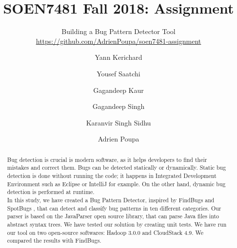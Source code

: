 \documentclass[sigconf]{acmart}
\begin{document}
\title{SOEN7481 Fall 2018: Assignment}
\subtitle{Building a Bug Pattern Detector Tool\\\url{https://github.com/AdrienPoupa/soen7481-assignment}}

\author{Yann Kerichard}

\author{Yousef Saatchi}

\author{Gagandeep Kaur}

\author{Gagandeep Singh}

\author{Karanvir Singh Sidhu}

\author{Adrien Poupa}


\begin{abstract}
Bug detection is crucial is modern software, as it helps developers to find their mistakes and correct them. Bugs can be detected statically or dynamically. Static bug detection is done without running the code; it happens in Integrated Development Environment such as Eclipse or IntelliJ for example. On the other hand, dynamic bug detection is performed at runtime.\\In this study, we have created a Bug Pattern Detector, inspired by FindBugs \cite{findbugs} and SpotBugs \cite{spotbugs}, that can detect and classify bug patterns in ten different categories. Our parser is based on the JavaParser \cite{javaparser} open source library, that can parse Java files into abstract syntax trees. We have tested our solution by creating unit tests. We have run our tool on two open-source softwares: Hadoop 3.0.0 and CloudStack 4.9. We compared the results with FindBugs. 

\end{abstract}


\maketitle
\end{document}
